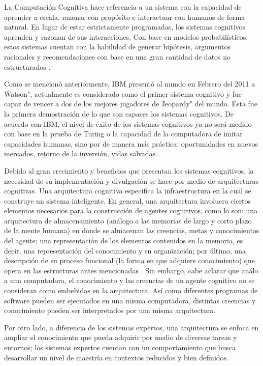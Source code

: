 La Computaci\'{o}n Cognitiva hace referencia a un sistema con la capacidad de aprender a escala, razonar con prop\'{o}sito e interactuar con humanos de forma natural. En lugar de estar estrictamente programadas, los sistemas cognitivos aprenden y razonan de sus interacciones. Con base en modelos probabil\'{i}sticos, estos sistemas cuentan con la habilidad de generar hip\'{o}tesis, argumentos racionales y recomendaciones con base en una gran cantidad de datos no estructurados \cite{ibmcc}.

Como se mencion\'{o} anteriormente, IBM present\'{o} al mundo en Febrero del 2011 a \"Watson", actualmente es considerado como el primer sistema cognitivo y fue capaz de vencer a dos de los mejores jugadores de \"Jeopardy" del mundo. Esta fue la primera demostraci\'{o}n de lo que son capaces los sistemas cognitivos. De acuerdo con IBM, el nivel de \'{e}xito de los sistemas cognitivos ya no ser\'{a} medido con base en la prueba de Turing o la capacidad de la computadora de imitar capacidades humanas, sino por de manera m\'{a}s pr\'{a}ctica: oportunidades en nuevos mercados, retorno de la inversi\'{o}n, vidas salvadas \cite{ibmcc}.

Debido al gran crecimiento y beneficios que presentan los sistemas cognitivos, la necesidad de su implementaci\'{o}n y divulgaci\'{o}n se hace por medio de arquitecturas cognitivas. Una arquitectura cognitiva especifica la infraestructura en la cual se construye un sistema inteligente. En general, una arquitectura involucra ciertos elementos necesarios para la construcci\'{o}n de agentes cognitivos, como lo son: una arquitectura de almacenamiento (an\'{a}logo a las memorias de largo y corto plazo de la mente humana) en donde se almacenan las creencias, metas y conocimientos del agente; una representaci\'{o}n de los elementos contenidos en la memoria, es decir, una representaci\'{o}n del conocimiento y su organizaci\'{o}n; por \'{u}ltimo, una descripci\'{o}n de su proceso funcional (la forma en que adquiere conocimiento) que opera en las estructuras antes mencionadas \cite{langley2009cognitive}. Sin embargo, cabe aclarar que an\'{a}lo a una computadora, el conocimiento y las creencias de un agente cognitivo no se consideran como embebidas en la arquitectura. As\'{i} como diferentes programas de software pueden ser ejecutados en una misma computadora, distintas creencias y conocimiento pueden ser interpretados por una misma arquitectura.

Por otro lado, a diferencia de los sistemas expertos, una arquitectura se enfoca en ampliar el conocimiento que pueda adquirir por medio de diversas tareas y entornos; los sistemas expertos cuentan con un comportamiento que busca desarrollar un nivel de maestr\'{i}a en contextos reducidos y bien definidos.


